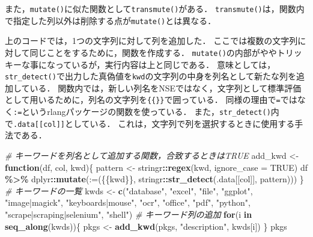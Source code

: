 \documentclass[
]{article}
\newenvironment{Shaded}{\begin{snugshade}}{\end{snugshade}}
\newcommand{\AttributeTok}[1]{\textcolor[rgb]{0.13,0.29,0.53}{#1}}
\newcommand{\CommentTok}[1]{\textcolor[rgb]{0.56,0.35,0.01}{\textit{#1}}}
\newcommand{\ConstantTok}[1]{\textcolor[rgb]{0.56,0.35,0.01}{#1}}
\newcommand{\ControlFlowTok}[1]{\textcolor[rgb]{0.13,0.29,0.53}{\textbf{#1}}}
\newcommand{\FunctionTok}[1]{\textcolor[rgb]{0.13,0.29,0.53}{\textbf{#1}}}
\newcommand{\NormalTok}[1]{#1}
\newcommand{\OtherTok}[1]{\textcolor[rgb]{0.56,0.35,0.01}{#1}}
\newcommand{\SpecialCharTok}[1]{\textcolor[rgb]{0.81,0.36,0.00}{\textbf{#1}}}
\newcommand{\StringTok}[1]{\textcolor[rgb]{0.31,0.60,0.02}{#1}}
\begin{document}
また，\texttt{mutate()}に似た関数として\texttt{transmute()}がある．
\texttt{transmute()}は，関数内で指定した列以外は削除する点が\texttt{mutate()}とは異なる．

上のコードでは，1つの文字列に対して列を追加した．
ここでは複数の文字列に対して同じことをするために，関数を作成する．
\texttt{mutate()}の内部がややトリッキーな事になっているが，実行内容は上と同じである．
意味としては，\texttt{str\_detect()}で出力した真偽値を\texttt{kwd}の文字列の中身を列名として新たな列を追加している．
関数内では，新しい列名をNSEではなく，文字列として標準評価として用いるために，列名の文字列を\texttt{\{\{\}\}}で囲っている．
同様の理由で\texttt{=}ではなく\texttt{:=}というrlangパッケージの関数を使っている．
また，\texttt{str\_detect()}内で\texttt{.data{[}{[}col{]}{]}}としている．
これは，文字列で列を選択するときに使用する手法である．

\begin{Shaded}
\begin{Highlighting}[]
  \CommentTok{\# キーワードを列名として追加する関数，合致するときはTRUE}
\NormalTok{add\_kwd }\OtherTok{\textless{}{-}} \ControlFlowTok{function}\NormalTok{(df, col, kwd)\{}
\NormalTok{  pattern }\OtherTok{\textless{}{-}}\NormalTok{ stringr}\SpecialCharTok{::}\FunctionTok{regex}\NormalTok{(kwd, }\AttributeTok{ignore\_case =} \ConstantTok{TRUE}\NormalTok{)}
\NormalTok{  df }\SpecialCharTok{\%\textgreater{}\%}
\NormalTok{    dplyr}\SpecialCharTok{::}\FunctionTok{mutate}\NormalTok{(}\StringTok{\textasciigrave{}}\AttributeTok{:=}\StringTok{\textasciigrave{}}\NormalTok{(\{\{kwd\}\}, stringr}\SpecialCharTok{::}\FunctionTok{str\_detect}\NormalTok{(.data[[col]], pattern)))}
\NormalTok{\}}
  \CommentTok{\# キーワードの一覧}
\NormalTok{kwds }\OtherTok{\textless{}{-}} 
  \FunctionTok{c}\NormalTok{(}\StringTok{"database"}\NormalTok{, }\StringTok{"excel"}\NormalTok{, }\StringTok{"file"}\NormalTok{, }\StringTok{"ggplot"}\NormalTok{, }\StringTok{"image|magick"}\NormalTok{, }\StringTok{"keyboards|mouse"}\NormalTok{, }
    \StringTok{"ocr"}\NormalTok{, }\StringTok{"office"}\NormalTok{, }\StringTok{"pdf"}\NormalTok{, }\StringTok{"python"}\NormalTok{, }\StringTok{"scrape|scraping|selenium"}\NormalTok{, }\StringTok{"shell"}\NormalTok{)}
  \CommentTok{\# キーワード列の追加}
\ControlFlowTok{for}\NormalTok{(i }\ControlFlowTok{in} \FunctionTok{seq\_along}\NormalTok{(kwds))\{}
\NormalTok{  pkgs }\OtherTok{\textless{}{-}} \FunctionTok{add\_kwd}\NormalTok{(pkgs, }\StringTok{"description"}\NormalTok{, kwds[i])}
\NormalTok{\}}
\NormalTok{pkgs}
\end{Highlighting}
\end{Shaded}
\end{document}
